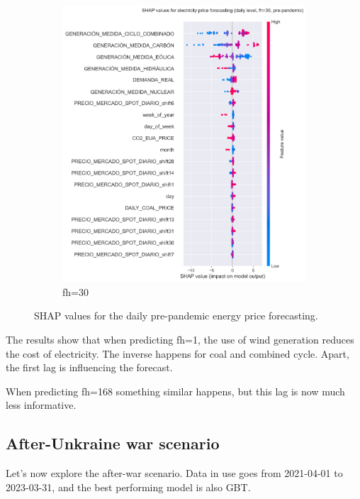 \begin{figure}[H]
\begin{subfigure}{.45\textwidth}
        \includegraphics[width=1\linewidth]{images/analysis/shap-daily-pre-30}
        \caption{fh=30}
    \end{subfigure}

    \caption{SHAP values for the daily pre-pandemic energy price forecasting.}
    \label{fig:shap-daily-pre}
\end{figure}

The results show that when predicting fh=1, the use of wind generation reduces the cost of electricity. The inverse happens for coal and combined cycle. Apart, the first lag is influencing the forecast.

When predicting fh=168 something similar happens, but this lag is now much less informative.

\subsection{After-Unkraine war scenario}
Let's now explore the after-war scenario. Data in use goes from 2021-04-01 to 2023-03-31, and the best performing model is also GBT.

